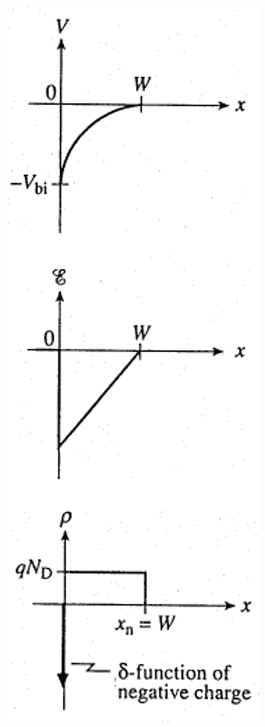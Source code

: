 \documentclass[10pt,t,aspectratio=169]{beamer}
\begin{document}
\begin{frame}[t]
\begin{columns}
\begin{column}{0.18\textwidth}
\centering
\includegraphics[width=\textwidth]{figures/schottky_electrostatics_2.png}


\end{column}
\end{columns}
\end{frame}
\end{document}
